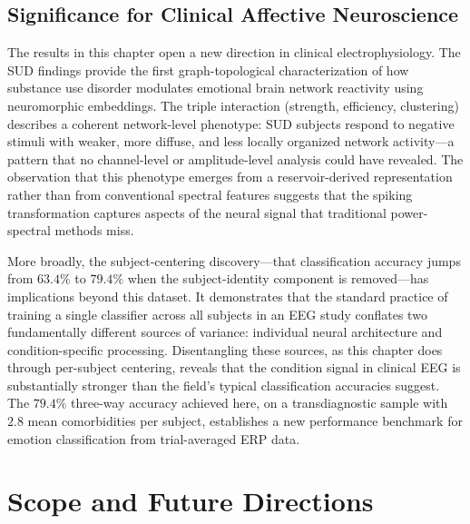 \subsection{Significance for Clinical Affective Neuroscience}

The results in this chapter open a new direction in clinical electrophysiology. The SUD findings provide the first graph-topological characterization of how substance use disorder modulates emotional brain network reactivity using neuromorphic embeddings. The triple interaction (strength, efficiency, clustering) describes a coherent network-level phenotype: SUD subjects respond to negative stimuli with weaker, more diffuse, and less locally organized network activity---a pattern that no channel-level or amplitude-level analysis could have revealed. The observation that this phenotype emerges from a reservoir-derived representation rather than from conventional spectral features suggests that the spiking transformation captures aspects of the neural signal that traditional power-spectral methods miss.

More broadly, the subject-centering discovery---that classification accuracy jumps from $63.4\%$ to $79.4\%$ when the subject-identity component is removed---has implications beyond this dataset. It demonstrates that the standard practice of training a single classifier across all subjects in an EEG study conflates two fundamentally different sources of variance: individual neural architecture and condition-specific processing. Disentangling these sources, as this chapter does through per-subject centering, reveals that the condition signal in clinical EEG is substantially stronger than the field's typical classification accuracies suggest. The $79.4\%$ three-way accuracy achieved here, on a transdiagnostic sample with $2.8$ mean comorbidities per subject, establishes a new performance benchmark for emotion classification from trial-averaged ERP data.


\section{Scope and Future Directions}
\label{sec:ch5_scope}

